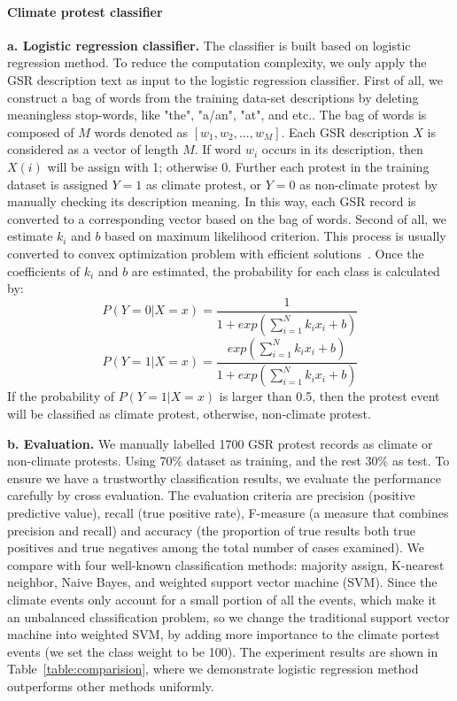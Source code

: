 \documentclass[9pt,twocolumn,twoside]{pnas-new}
\begin{document}
{\paragraph{Climate protest classifier}
\textbf{a. Logistic regression classifier.} 
The classifier is built based on logistic regression method.
To reduce the computation complexity, we only apply the GSR description text as input to the logistic regression classifier. First of all, we construct a bag of words from the training data-set descriptions by deleting meaningless stop-words, like "the", "a/an", "at", and etc.. The bag of words is composed of $M$ words denoted as $[w_1, w_2, ..., w_M]$.
Each GSR description $X$ is considered as a vector of length $M$. If word $w_i$ occurs in its description, then $X(i)$ will be assign with 1; otherwise 0. Further each protest in the training dataset is assigned $Y=1$ as climate protest, or $Y=0$ as non-climate protest by manually checking its description meaning. In this way, each GSR record is converted to a corresponding vector based on the bag of words. Second of all, we estimate $k_i$ and $b$ based on maximum likelihood criterion. This process is usually converted to convex optimization problem with efficient solutions~\cite{james2013introduction}. Once the coefficients of $k_i$ and $b$ are estimated, the probability for each class is calculated by:
$$P(Y = 0| X=x)= \frac{1}{1+exp( {\sum_{i=1}^{N} k_ix_i}+b)}$$
$$P(Y = 1| X=x)= \frac{exp( {\sum_{i=1}^{N} k_ix_i}+b)}{1+exp( {\sum_{i=1}^{N} k_ix_i}+b)}$$
If the probability of $P(Y = 1| X=x)$ is larger than 0.5, then the protest event will be classified as climate protest, otherwise, non-climate protest.

\textbf{b. Evaluation.}
We manually labelled 1700 GSR protest records as climate or non-climate protests. Using 70\% dataset as training, and the rest 30\% as test. To ensure we have a trustworthy classification results, we evaluate the performance carefully by cross evaluation. The evaluation criteria are precision (positive predictive value), recall (true positive rate), F-measure (a measure that combines precision and recall) and accuracy (the proportion of true results both true positives and true negatives among the total number of cases examined). We compare with four well-known classification methods: majority assign, K-nearest neighbor, Naive Bayes, and weighted support vector machine (SVM). Since the climate events only account for a small portion of all the events, which make it an unbalanced classification problem, so we change the traditional support vector machine into weighted SVM, by adding more importance to the climate portest events (we set the class weight to be 100). The experiment results are shown in Table~\ref{table:comparision}, where we demonstrate logistic regression method outperforms other methods uniformly.

}
\end{document}
